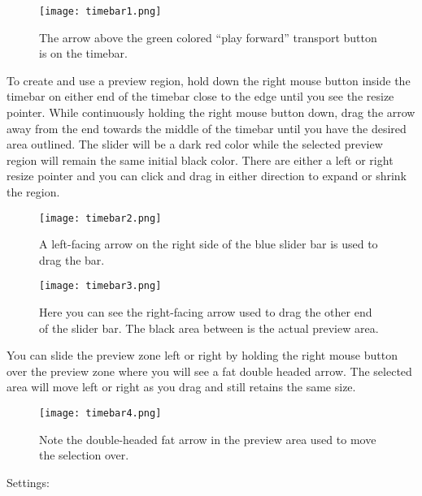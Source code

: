 \begin{figure}[htpb]
    \centering
    \texttt{[image: timebar1.png]}
    \caption{The arrow above the green colored “play forward” transport button is on the timebar.}
    \label{fig:timebar1}
\end{figure}

To create and use a preview region, hold down the right mouse button inside the timebar on either end of the timebar close to the edge until you see the resize pointer.  
While continuously holding the right mouse button down, drag the arrow away from the end towards the middle of the timebar until you have the desired area outlined.  
The slider will be a dark red color while the selected preview region will remain the same initial black color.  
There are either a left or right resize pointer and you can click and drag in either direction to expand or shrink the region.

\begin{figure}[htpb]
    \centering
    \texttt{[image: timebar2.png]}
    \caption{ A left-facing arrow on the right side of the blue slider bar is used to drag the bar.}
    \label{fig:timebar2}
\end{figure}

\begin{figure}[htpb]
    \centering
    \texttt{[image: timebar3.png]}
    \caption{Here you can see the right-facing arrow used to drag the other end of the slider bar.  
        The black area between is the actual preview area.}
    \label{fig:timebar3}
\end{figure}

You can slide the preview zone left or right by holding the right mouse button over the preview zone where you will see a fat double headed arrow.  
The selected area will move left or right as you drag and still retains the same size.

\begin{figure}[htpb]
    \centering
    \texttt{[image: timebar4.png]}
    \caption{Note the double-headed fat arrow in the preview area used  to move the selection over.}
    \label{fig:timebar4}
\end{figure}

Settings:

